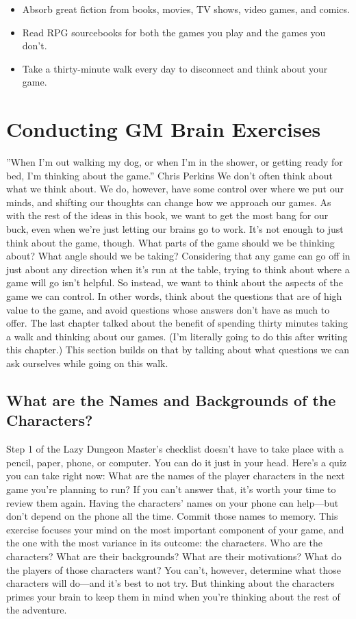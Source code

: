\documentclass[10pt,a4paper,twoside,bg=print,twocolumn,openany,nodeprecatedcode]{dndbook}
\begin{document}
\begin{itemize}
\item Absorb great fiction from books, movies, TV shows, video games, and comics.
\item Read RPG sourcebooks for both the games you play and the games you don't.
\item Take a thirty-minute walk every day to disconnect and think about your game.
\end{itemize}

\section{Conducting GM Brain Exercises}
\DndQuote%
{}
{''When I'm out walking my dog, or when I'm in the shower, or getting ready for bed, I'm thinking about the game.''}
{Chris Perkins}
We don't often think about what we think about. We do, however, have some control over where we put our minds, and shifting our thoughts can change how we approach our games. As with the rest of the ideas in this book, we want to get the most bang for our buck, even when we're just letting our brains go to work.
It's not enough to just think about the game, though. What parts of the game should we be thinking about? What angle should we be taking? Considering that any game can go off in just about any direction when it's run at the table, trying to think about where a game will go isn't helpful. So instead, we want to think about the aspects of the game we can control. In other words, think about the questions that are of high value to the game, and avoid questions whose answers don't have as much to offer.
The last chapter talked about the benefit of spending thirty minutes taking a walk and thinking about our games. (I'm literally going to do this after writing this chapter.) This section builds on that by talking about what questions we can ask ourselves while going on this walk.
\subsection{What are the Names and Backgrounds of the Characters?}
Step 1 of the Lazy Dungeon Master's checklist doesn't have to take place with a pencil, paper, phone, or computer. You can do it just in your head. Here's a quiz you can take right now: What are the names of the player characters in the next game you're planning to run? If you can't answer that, it's worth your time to review them again. Having the characters' names on your phone can help—but don't depend on the phone all the time. Commit those names to memory.
This exercise focuses your mind on the most important component of your game, and the one with the most variance in its outcome: the characters. Who are the characters? What are their backgrounds? What are their motivations? What do the players of those characters want?
You can't, however, determine what those characters will do—and it's best to not try. But thinking about the characters primes your brain to keep them in mind when you're thinking about the rest of the adventure.
\end{document}
